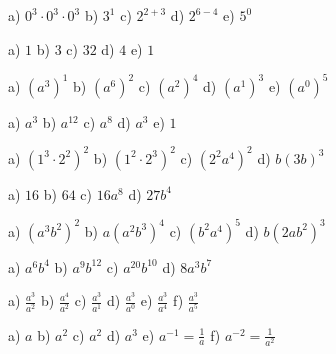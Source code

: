     \begin{tehtava}
        a) $0^3\cdot0^3\cdot0^3$ \qquad
        b) $3^1$ \qquad
        c) $2^{2+3}$ \qquad
        d) $2^{6-4}$ \qquad
        e) $5^0$

        \begin{vastaus}
            a) $1$ \qquad
            b) $3$ \qquad
            c) $32$ \qquad
            d) $4$ \qquad
            e) $1$
        \end{vastaus}
    \end{tehtava}
    \begin{tehtava}
        a) $(a^3)^1$ \qquad
        b) $(a^6)^2$ \qquad
        c) $(a^2)^4$ \qquad 
        d) $(a^1)^3$ \qquad
        e) $(a^0)^5$

        \begin{vastaus}
            a) $a^3$ \qquad
            b) $a^{12}$ \qquad
            c) $a^8$ \qquad
            d) $a^3$ \qquad
            e) $1$
        \end{vastaus}
    \end{tehtava}
    
       \begin{tehtava}
        a) $(1^3\cdot 2^2)^2$ \qquad
        b) $(1^2\cdot 2^3)^2$ \qquad
        c) $(2^2a^4)^2$ \qquad
        d) $b(3b)^3$

        \begin{vastaus}
            a) $16$ \qquad
            b) $64$ \qquad
            c) $16a^8$ \qquad
            d) $27b^4$
        \end{vastaus}
    \end{tehtava}
    
    \begin{tehtava}
        a) $(a^3b^2)^2$ \qquad
        b) $a(a^2b^3)^4$ \qquad
        c) $(b^2a^4)^5$ \qquad
        d) $b(2ab^2)^3$
        
        \begin{vastaus}
            a) $a^6b^4$ \qquad
            b) $a^9b^{12}$ \qquad
            c) $a^{20}b^{10}$ \qquad
            d) $8a^3b^7$
        \end{vastaus}
    \end{tehtava}
      
    \begin{tehtava}
        a) $\frac{a^3}{a^2}$ \qquad
        b) $\frac{a^4}{a^2}$ \qquad
        c) $\frac{a^3}{a^1}$ \qquad
        d) $\frac{a^3}{a^0}$ \qquad
        e) $\frac{a^3}{a^4}$ \qquad
        f) $\frac{a^3}{a^5}$
        
        \begin{vastaus}
            a) $a$ \qquad
            b) $a^2$ \qquad
            c) $a^2$ \qquad
            d) $a^3$ \qquad
            e) $a^{-1} = \frac{1}{a}$ \qquad
            f) $a^{-2} = \frac{1}{a^2}$
        \end{vastaus}
    \end{tehtava}
    
